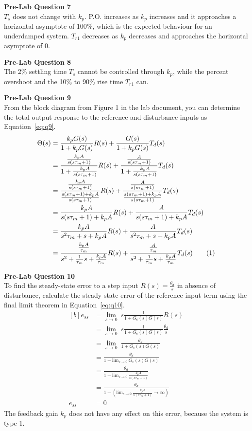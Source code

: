 \documentclass[12pt]{article}
\begin{document}
\textbf{Pre-Lab Question 7} \\
$T_s$ does not change with $k_p$. P.O. increases as $k_p$ increases and it approaches a horizontal asymptote of 100\%, which is the expected behaviour for an underdamped system. $T_{r1}$ decreases as $k_p$ decreases and approaches the horizontal asymptote of 0.

\textbf{Pre-Lab Question 8} \\
The 2\% settling time $T_s$ cannot be controlled through $k_p$, while the percent overshoot and the 10\% to 90\% rise time $T_{r1}$ can.

\textbf{Pre-Lab Question 9} \\
From the block diagram from Figure 1 in the lab document, you can determine the total output response to the reference and disturbance inputs as Equation~\ref{eq:q9}.
\begin{align*}
    \Theta(s) &= \frac{k_pG(s)}{1 + k_pG(s)}R(s) + \frac{G(s)}{1 + k_pG(s)}T_d(s) \\
    &= \frac{\frac{k_pA}{s(s\tau_m + 1)}}{1 + \frac{k_pA}{s(s\tau_m + 1)}}R(s) + \frac{\frac{A}{s(s\tau_m + 1)}}{1 + \frac{k_pA}{s(s\tau_m + 1)}}T_d(s) \\
    &= \frac{\frac{k_pA}{s(s\tau_m + 1)}}{\frac{s(s\tau_m + 1) + k_pA}{s(s\tau_m + 1)}}R(s) + \frac{\frac{A}{s(s\tau_m + 1)}}{\frac{s(s\tau_m + 1) + k_pA}{s(s\tau_m + 1)}}T_d(s) \\
    &= \frac{k_pA}{s(s\tau_m + 1) + k_pA}R(s) + \frac{A}{s(s\tau_m + 1) + k_pA}T_d(s) \\
    &= \frac{k_pA}{s^2\tau_m + s + k_pA}R(s) + \frac{A}{s^2\tau_m + s + k_pA}T_d(s) \\
    &= \frac{\frac{k_pA}{\tau_m}}{s^2 + \frac{1}{\tau_m}s + \frac{k_pA}{\tau_m}}R(s) + \frac{\frac{A}{\tau_m}}{s^2 + \frac{1}{\tau_m}s + \frac{k_pA}{\tau_m}}T_d(s) \stepcounter{equation}\tag{\theequation}\label{eq:q9}
\end{align*}

\textbf{Pre-Lab Question 10} \\
To find the steady-state error to a step input $R(s) = \frac{\theta_d}{s}$ in absence of disturbance, calculate the steady-state error of the reference input term using the final limit theorem in Equation~\ref{eq:q10}.
\begin{equation} \label{eq:q10}
\begin{aligned}[b]
    e_{ss} &= \lim_{s \to 0} \ s \frac{1}{1 + G_c(s)G(s)} R(s) \\
    &= \lim_{s \to 0} \ s \frac{1}{1 + G_c(s)G(s)} \frac{\theta_d}{s} \\
    &= \lim_{s \to 0} \ \frac{\theta_d}{1 + G_c(s)G(s)} \\
    &= \frac{\theta_d}{1 + \text{lim}_{s \to 0} \ G_c(s)G(s)} \\
    &= \frac{\theta_d}{1 + \text{lim}_{s \to 0} \ \frac{k_pA}{s(s\tau_m + 1)}} \\
    &= \frac{\theta_d}{1 + (\text{lim}_{s \to 0} \ \frac{k_pA}{s(s\tau_m + 1)}\to \infty)} \\
    e_{ss} &= 0
\end{aligned}
\end{equation}
The feedback gain $k_p$ does not have any effect on this error, because the system is type 1.
\end{document}
